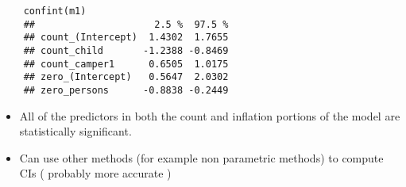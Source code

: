 \documentclass[MASTER.tex]{subfiles}
\begin{document}

\begin{frame}[fragile]
	\large
	\begin{verbatim}
	confint(m1)
	##                     2.5 %  97.5 %
	## count_(Intercept)  1.4302  1.7655
	## count_child       -1.2388 -0.8469
	## count_camper1      0.6505  1.0175
	## zero_(Intercept)   0.5647  2.0302
	## zero_persons      -0.8838 -0.2449
	\end{verbatim}
\end{frame}
\begin{frame}[fragile]
	\begin{itemize}
		\item	All of the predictors in both the count and inflation portions of the model are statistically significant. 
		\item Can use other methods  (for example non parametric methods) to compute CIs ( probably more accurate )
	\end{itemize}
\end{frame}

%	
%	
\end{document}
